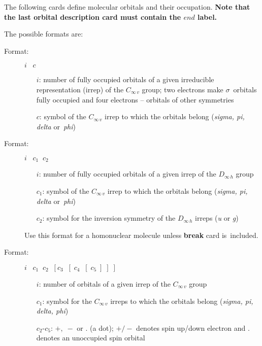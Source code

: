 \documentclass[12pt,a4paper]{article}
\begin{document}
\begin{description}
The following cards define molecular orbitals and their occupation.
\textbf{Note that the last orbital description card must contain the
  $end$ label.}

The possible formats are:
\begin{description}
\item[Format:] $i\;\;\;c$
\begin{itemize}
\item[$i$:] number of fully occupied orbitals of a given irreducible
     representation (irrep) of the $C_{\infty\,v}$ group;
	two electrons make $\sigma$~orbitals fully occupied
     and four electrons -- orbitals of other symmetries
\item[$c$:] symbol of the $C_{\infty\,v}$ irrep to which the orbitals
     belong ({\it sigma, pi, delta} or~{\it phi})
\end{itemize}
\end{description}


\begin{description}
\item[Format:] $i\;\;\;c_1 \;\;c_2$
\begin{itemize}
\item[$i$:] number of fully occupied orbitals of a given irrep of the
$D_{\infty\,h}$ group
\item[$c_1$:] symbol of the $C_{\infty\,v}$ irrep to which the orbitals belong
       ({\it sigma, pi, delta} or~{\it phi})
\item[$c_2$:] symbol for the inversion symmetry of the $D_{\infty\,h}$ irreps
       ({\it u} or {\it g})
\end{itemize}
Use this format for a homonuclear molecule unless \textbf{break} card
is~included.
\end{description}


\begin{description}
\item[Format:]
$i\;\;\;c_1\;\;c_2\;\;[c_3\;\;[\;c_4\;\;[\;c_5\;]\;]\;]$
\begin{itemize}
\item[$i$:] number of orbitals of a given irrep of the $C_{\infty\,v}$  group
\item[$c_1$:] symbol for the $C_{\infty\,v}$ irreps to which the
orbitals belong ({\it sigma, pi, delta, phi})
\item[$c_2$-$c_5$:] $+,\;-$ or . (a dot); $+/-$ denotes spin up/down
electron and . denotes an unoccupied spin orbital
\end{itemize}
\end{description}


\end{description}
\end{document}
